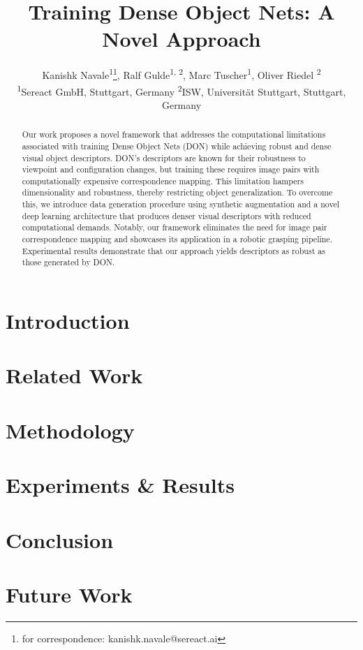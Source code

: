 \documentclass{article}
\title{Training Dense Object Nets: A Novel Approach}
\author{%
  Kanishk Navale\textsuperscript{1}\thanks{for correspondence: kanishk.navale@sereact.ai}, \quad
  Ralf Gulde\textsuperscript{1, 2}, \quad
  Marc Tuscher\textsuperscript{1}, \quad
  Oliver Riedel \textsuperscript{2}\\
  \textsuperscript{1}Sereact GmbH, Stuttgart, Germany \quad
  \textsuperscript{2}ISW, Universität Stuttgart, Stuttgart, Germany\\
}
\begin{document}
\maketitle

\begin{abstract}
  Our work proposes a novel framework that addresses the computational limitations associated with training Dense Object Nets (DON)
  while achieving robust and dense visual object descriptors. DON's descriptors are known for their robustness to
  viewpoint and configuration changes, but training these requires image pairs with computationally expensive correspondence mapping.
  This limitation hampers dimensionality and robustness, thereby restricting object generalization.
  To overcome this, we introduce data generation procedure using synthetic augmentation and a novel deep learning architecture
  that produces denser visual descriptors with reduced computational demands. Notably, our framework eliminates the need for
  image pair correspondence mapping and showcases its application in a robotic grasping pipeline.
  Experimental results demonstrate that our approach yields descriptors as robust as those generated by DON.
\end{abstract}

\section{Introduction}


\section{Related Work}


\section{Methodology}


\section{Experiments \& Results}


\section{Conclusion}


\section{Future Work}


\printbibliography
\end{document}
